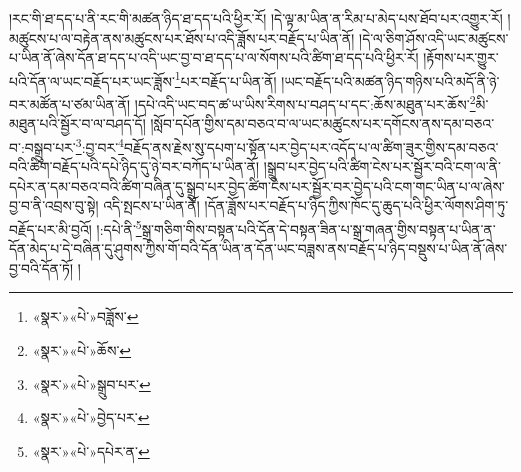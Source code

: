 །རང་གི་ཐ་དད་པ་ནི་རང་གི་མཚན་ཉིད་ཐ་དད་པའི་ཕྱིར་རོ། །དེ་ལྟ་མ་ཡིན་ན་རིམ་པ་མེད་པས་ཐོབ་པར་འགྱུར་རོ། །མཚུངས་པ་ལ་བརྟེན་ནས་མཚུངས་པར་ཐོས་པ་འདི་ཟློས་པར་བརྗོད་པ་ཡིན་ནོ། །དེ་ལ་ཅིག་ཤོས་འདི་ཡང་མཚུངས་པ་ཡིན་ནོ་ཞེས་དོན་ཐ་དད་པ་འདི་ཡང་བྱ་བ་ཐ་དད་པ་ལ་སོགས་པའི་ཚིག་ཐ་དད་པའི་ཕྱིར་རོ། །རྟོགས་པར་གྱུར་པའི་དོན་ལ་ཡང་བརྗོད་པར་ཡང་ཟློས་\footnote{«སྣར་»«པེ་»བཟློས་}པར་བརྗོད་པ་ཡིན་ནོ། །ཡང་བརྗོད་པའི་མཚན་ཉིད་གཉིས་པའི་མདོ་ནི་ཉེ་བར་མཚོན་པ་ཙམ་ཡིན་ནོ། །དཔེ་འདི་ཡང་བད་ཚ་ཡ་ཡིས་རིགས་པ་བཤད་པ་དང་:ཆོས་མཐུན་པར་ཆོས་\footnote{«སྣར་»«པེ་»ཆོས་}མི་མཐུན་པའི་སྦྱོར་བ་ལ་བཤད་དོ། །སློབ་དཔོན་གྱིས་དམ་བཅའ་བ་ལ་ཡང་མཚུངས་པར་དགོངས་ནས་དམ་བཅའ་བ་:བསྒྲུབ་པར་\footnote{«སྣར་»«པེ་»སྒྲུབ་པར་}:བྱ་བར་\footnote{«སྣར་»«པེ་»བྱེད་པར་}བརྗོད་ནས་རྗེས་སུ་དཔག་པ་སྟོན་པར་བྱེད་པར་འདོད་པ་ལ་ཚིག་ཟུར་གྱིས་དམ་བཅའ་བའི་ཚིག་བརྗོད་པའི་དཔེ་ཉིད་དུ་ཉེ་བར་བཀོད་པ་ཡིན་ནོ། །སྒྲུབ་པར་བྱེད་པའི་ཚིག་ངེས་པར་སྦྱོར་བའི་ངག་ལ་ནི་དཔེར་ན་དམ་བཅའ་བའི་ཚིག་བཞིན་དུ་སྒྲུབ་པར་བྱེད་ཚིག་ངེས་པར་སྦྱོར་བར་བྱེད་པའི་ངག་གང་ཡིན་པ་ལ་ཞེས་བྱ་བ་ནི་འབྲས་བུ་སྟེ། འདི་སྤངས་པ་ཡིན་ནོ། །དོན་ཟློས་པར་བརྗོད་པ་ཉིད་ཀྱིས་ཁོང་དུ་ཆུད་པའི་ཕྱིར་ལོགས་ཤིག་ཏུ་བརྗོད་པར་མི་བྱའོ། །:དཔེ་ནི་\footnote{«སྣར་»«པེ་»དཔེར་ན་}སྒྲ་གཅིག་གིས་བསྟན་པའི་དོན་དེ་བསྟན་ཟིན་པ་སྒྲ་གཞན་གྱིས་བསྟན་པ་ཡིན་ན་དོན་མེད་པ་དེ་བཞིན་དུ་ཤུགས་ཀྱིས་གོ་བའི་དོན་ཡིན་ན་དོན་ཡང་བཟླས་ནས་བརྗོད་པ་ཉིད་བསྡུས་པ་ཡིན་ནོ་ཞེས་བྱ་བའི་དོན་ཏོ། །
